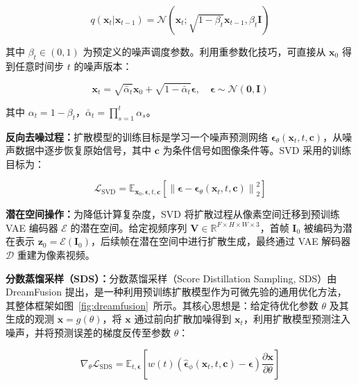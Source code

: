 \begin{equation}
q(\mathbf{x}_t | \mathbf{x}_{t-1}) = \mathcal{N}(\mathbf{x}_t; \sqrt{1 - \beta_t} \mathbf{x}_{t-1}, \beta_t \mathbf{I})
\end{equation}

其中 $\beta_t \in (0, 1)$ 为预定义的噪声调度参数。利用重参数化技巧，可直接从 $\mathbf{x}_0$ 得到任意时间步 $t$ 的噪声版本：

\begin{equation}
\mathbf{x}_t = \sqrt{\bar{\alpha}_t} \mathbf{x}_0 + \sqrt{1 - \bar{\alpha}_t} \boldsymbol{\epsilon}, \quad \boldsymbol{\epsilon} \sim \mathcal{N}(\mathbf{0}, \mathbf{I})
\end{equation}

其中 $\alpha_t = 1 - \beta_t$，$\bar{\alpha}_t = \prod_{s=1}^{t} \alpha_s$。

\textbf{反向去噪过程：}扩散模型的训练目标是学习一个噪声预测网络 $\boldsymbol{\epsilon}_\theta(\mathbf{x}_t, t, \mathbf{c})$，从噪声数据中逐步恢复原始信号，其中 $\mathbf{c}$ 为条件信号如图像条件等。SVD 采用的训练目标为：

\begin{equation}
\mathcal{L}_{\text{SVD}} = \mathbb{E}_{\mathbf{x}_0, \boldsymbol{\epsilon}, t, \mathbf{c}} \left[ \left\| \boldsymbol{\epsilon} - \boldsymbol{\epsilon}_\theta(\mathbf{x}_t, t, \mathbf{c}) \right\|_2^2 \right]
\end{equation}

\textbf{潜在空间操作：}为降低计算复杂度，SVD 将扩散过程从像素空间迁移到预训练 VAE 编码器 $\mathcal{E}$ 的潜在空间。给定视频序列 $\mathbf{V} \in \mathbb{R}^{F \times H \times W \times 3}$，首帧 $\mathbf{I}_0$ 被编码为潜在表示 $\mathbf{z}_0 = \mathcal{E}(\mathbf{I}_0)$，后续帧在潜在空间中进行扩散生成，最终通过 VAE 解码器 $\mathcal{D}$ 重建为像素视频。

\textbf{分数蒸馏采样（SDS）：}分数蒸馏采样（Score Distillation Sampling, SDS）由 DreamFusion\cite{dreamfusion} 提出，是一种利用预训练扩散模型作为可微先验的通用优化方法，其整体框架如图~\ref{fig:dreamfusion}~所示。其核心思想是：给定待优化参数 $\theta$ 及其生成的观测 $\mathbf{x} = g(\theta)$，将 $\mathbf{x}$ 通过前向扩散加噪得到 $\mathbf{x}_t$，利用扩散模型预测注入噪声，并将预测误差的梯度反传至参数 $\theta$：

\begin{equation}
\nabla_\theta \mathcal{L}_{\text{SDS}} = \mathbb{E}_{t, \boldsymbol{\epsilon}} \left[ w(t) \left( \hat{\boldsymbol{\epsilon}}_\phi(\mathbf{x}_t, t, \mathbf{c}) - \boldsymbol{\epsilon} \right) \frac{\partial \mathbf{x}}{\partial \theta} \right]
\end{equation}

